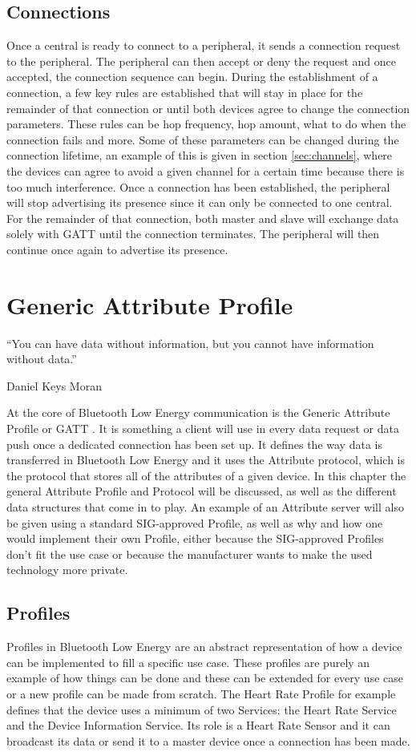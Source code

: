 \documentclass[pdftex,a4paper,12pt,twoside]{report}
\begin{document}
\section{Connections}
\label{sec:connections}
Once a central is ready to connect to a peripheral, it sends a connection request to the peripheral. The peripheral can then accept or deny the request and once accepted, the connection sequence can begin. During the establishment of a connection, a few key rules are established that will stay in place for the remainder of that connection or until both devices agree to change the connection parameters. These rules can be hop frequency, hop amount, what to do when the connection fails and more. Some of these parameters can be changed during the connection lifetime, an example of this is given in section \ref{sec:channels}, where the devices can agree to avoid a given channel for a certain time because there is too much interference. Once a connection has been established, the peripheral will stop advertising its presence since it can only be connected to one central. For the remainder of that connection, both master and slave will exchange data solely with GATT until the connection terminates. The peripheral will then continue once again to advertise its presence.

\chapter{Generic Attribute Profile}
\label{ch:gatt}
\epigraph{``You can have data without information, but you cannot have information without data.''}{Daniel Keys Moran}
At the core of Bluetooth Low Energy communication is the Generic Attribute Profile or GATT \citep{Townsend2014}. It is something a client will use in every data request or data push once a dedicated connection has been set up. It defines the way data is transferred in Bluetooth Low Energy and it uses the Attribute protocol, which is the protocol that stores all of the attributes of a given device. In this chapter the general Attribute Profile and Protocol will be discussed, as well as the different data structures that come in to play. An example of an Attribute server will also be given using a standard SIG-approved Profile, as well as why and how one would implement their own Profile, either because the SIG-approved Profiles don't fit the use case or because the manufacturer wants to make the used technology more private.

\newpage{}

\section{Profiles}
\label{sec:profiles}
Profiles in Bluetooth Low Energy are an abstract representation of how a device can be implemented to fill a specific use case. These profiles are purely an example of how things can be done and these can be extended for every use case or a new profile can be made from scratch. The Heart Rate Profile for example defines that the device uses a minimum of two Services: the Heart Rate Service and the Device Information Service. Its role is a Heart Rate Sensor and it can broadcast its data or send it to a master device once a connection has been made.
\end{document}
